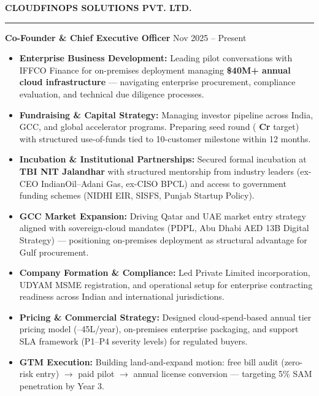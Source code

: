 \documentclass[a4paper,10pt]{article}
\newcommand{\cvsection}[1]{%
  \vspace{2mm}
  \noindent\textbf{\large\MakeUppercase{#1}}
  \vspace{1mm}
  \hrule
  \vspace{1.5mm}
}
\begin{document}
\cvsection{CloudFinOps Solutions Pvt. Ltd.}
\textbf{Co-Founder \& Chief Executive Officer} \hfill Nov 2025 -- Present
\begin{itemize}
    \item \textbf{Enterprise Business Development:} Leading pilot conversations with IFFCO Finance for on-premises deployment managing \textbf{\$40M+ annual cloud infrastructure} --- navigating enterprise procurement, compliance evaluation, and technical due diligence processes.

    \item \textbf{Fundraising \& Capital Strategy:} Managing investor pipeline across India, GCC, and global accelerator programs. Preparing seed round (\textbf{ Cr} target) with structured use-of-funds tied to 10-customer milestone within 12 months.

    \item \textbf{Incubation \& Institutional Partnerships:} Secured formal incubation at \textbf{TBI NIT Jalandhar} with structured mentorship from industry leaders (ex-CEO IndianOil--Adani Gas, ex-CISO BPCL) and access to government funding schemes (NIDHI EIR, SISFS, Punjab Startup Policy).

    \item \textbf{GCC Market Expansion:} Driving Qatar and UAE market entry strategy aligned with sovereign-cloud mandates (PDPL, Abu Dhabi AED 13B Digital Strategy) --- positioning on-premises deployment as structural advantage for Gulf procurement.

    \item \textbf{Company Formation \& Compliance:} Led Private Limited incorporation, UDYAM MSME registration, and operational setup for enterprise contracting readiness across Indian and international jurisdictions.

    \item \textbf{Pricing \& Commercial Strategy:} Designed cloud-spend-based annual tier pricing model (--45L/year), on-premises enterprise packaging, and support SLA framework (P1--P4 severity levels) for regulated buyers.

    \item \textbf{GTM Execution:} Building land-and-expand motion: free bill audit (zero-risk entry) $\rightarrow$ paid pilot $\rightarrow$ annual license conversion --- targeting 5\% SAM penetration by Year 3.
\end{itemize}
\end{document}
